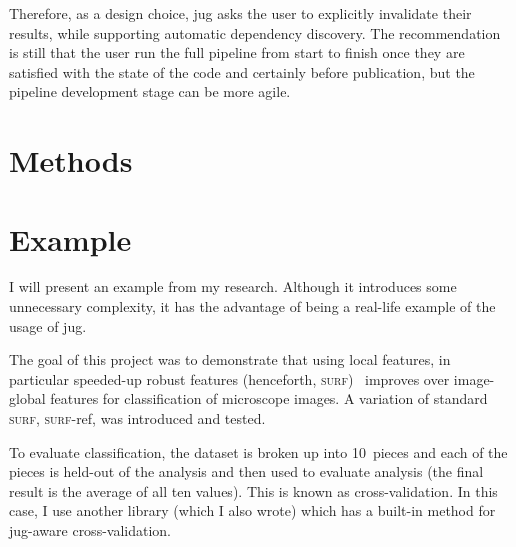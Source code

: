 \documentclass{article}
\begin{document}
Therefore, as a design choice, jug asks the user to explicitly invalidate their
results, while supporting automatic dependency discovery. The recommendation is
still that the user run the full pipeline from start to finish once they are
satisfied with the state of the code and certainly before publication, but the
pipeline development stage can be more agile.

\section{Methods}
\section{Example}

I will present an example from my research. Although it introduces some
unnecessary complexity, it has the advantage of being a real-life example of
the usage of jug.

The goal of this project was to demonstrate that using local features, in
particular speeded-up robust features (henceforth,
\textsc{surf})~\cite{surf-paper} improves over image-global features for
classification of microscope images. A variation of standard \textsc{surf},
\textsc{surf}-ref, was introduced and tested.

To evaluate classification, the dataset is broken up into 10~pieces and each of
the pieces is held-out of the analysis and then used to evaluate analysis (the
final result is the average of all ten values). This is known as
cross-validation. In this case, I use another library (which I also wrote)
which has a built-in method for jug-aware cross-validation.
\end{document}
